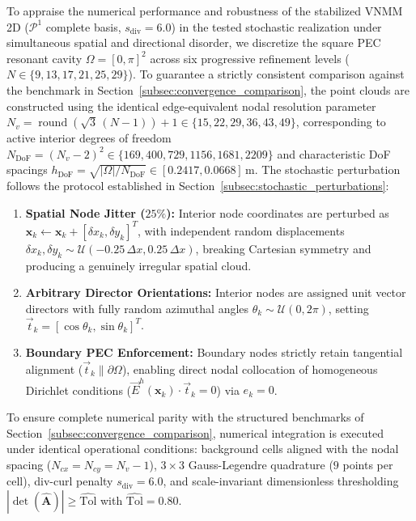 \documentclass[preprint,12pt]{elsarticle}
\begin{document}
To appraise the numerical performance and robustness of the stabilized VNMM 2D ($\mathcal{P}^1$ complete basis, $s_{\mathrm{div}} = 6.0$) in the tested stochastic realization under simultaneous spatial and directional disorder, we discretize the square PEC resonant cavity $\Omega = [0, \pi]^2$ across six progressive refinement levels ($N \in \{9, 13, 17, 21, 25, 29\}$). To guarantee a strictly consistent comparison against the benchmark in Section~\ref{subsec:convergence_comparison}, the point clouds are constructed using the identical edge-equivalent nodal resolution parameter $N_v = \operatorname{round}(\sqrt{3}\,(N - 1)) + 1 \in \{15, 22, 29, 36, 43, 49\}$, corresponding to active interior degrees of freedom $N_{\mathrm{DoF}} = (N_v - 2)^2 \in \{169, 400, 729, 1156, 1681, 2209\}$ and characteristic DoF spacings $h_{\mathrm{DoF}} = \sqrt{|\Omega|/N_{\mathrm{DoF}}} \in [0.2417, 0.0668]$\,m. The stochastic perturbation follows the protocol established in Section~\ref{subsec:stochastic_perturbations}:
\begin{enumerate}
    \item \textbf{Spatial Node Jitter ($25\%$):} Interior node coordinates are perturbed as $\mathbf{x}_k \leftarrow \mathbf{x}_k + [\delta x_k, \delta y_k]^T$, with independent random displacements $\delta x_k, \delta y_k \sim \mathcal{U}(-0.25\,\Delta x, 0.25\,\Delta x)$, breaking Cartesian symmetry and producing a genuinely irregular spatial cloud.
    \item \textbf{Arbitrary Director Orientations:} Interior nodes are assigned unit vector directors with fully random azimuthal angles $\theta_k \sim \mathcal{U}(0, 2\pi)$, setting $\vec{t}_k = [\cos\theta_k, \sin\theta_k]^T$.
    \item \textbf{Boundary PEC Enforcement:} Boundary nodes strictly retain tangential alignment ($\vec{t}_k \parallel \partial\Omega$), enabling direct nodal collocation of homogeneous Dirichlet conditions ($\vec{E}^h(\mathbf{x}_k) \cdot \vec{t}_k = 0$) via $e_k = 0$.
\end{enumerate}

To ensure complete numerical parity with the structured benchmarks of Section~\ref{subsec:convergence_comparison}, numerical integration is executed under identical operational conditions: background cells aligned with the nodal spacing ($N_{cx} = N_{cy} = N_v - 1$), $3 \times 3$ Gauss-Legendre quadrature ($9$ points per cell), div-curl penalty $s_{\mathrm{div}} = 6.0$, and scale-invariant dimensionless thresholding $|\det(\widehat{\mathbf{A}})| \ge \widehat{\mathrm{Tol}}$ with $\widehat{\mathrm{Tol}} = 0.80$.
\end{document}
